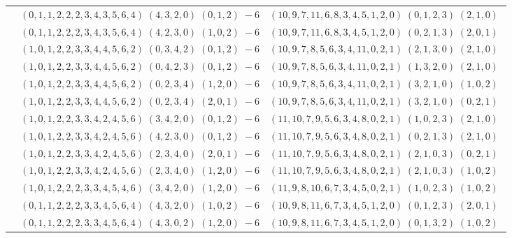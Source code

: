 \documentclass[11pt]{article}
\begin{document}
\begin{longtable}[l]{|c|c|c|}
 \cline{2-3} 
 & $(0 ,1 ,1 ,2 ,2 ,2 ,3 ,4 ,3 ,5 ,6 ,4) \;(4 ,3 ,2 ,0) \;(0 ,1 ,2) \;-6$ & $(10 ,9 ,7 ,11 ,6 ,8 ,3 ,4 ,5 ,1 ,2 ,0) \;(0 ,1 ,2 ,3) \;(2 ,1 ,0) \;$\\ 
 \cline{2-3} 
 & $(0 ,1 ,1 ,2 ,2 ,2 ,3 ,4 ,3 ,5 ,6 ,4) \;(4 ,2 ,3 ,0) \;(1 ,0 ,2) \;-6$ & $(10 ,9 ,7 ,11 ,6 ,8 ,3 ,4 ,5 ,1 ,2 ,0) \;(0 ,2 ,1 ,3) \;(2 ,0 ,1) \;$\\ 
 \cline{2-3} 
 & $(1 ,0 ,1 ,2 ,2 ,3 ,3 ,4 ,4 ,5 ,6 ,2) \;(0 ,3 ,4 ,2) \;(0 ,1 ,2) \;-6$ & $(10 ,9 ,7 ,8 ,5 ,6 ,3 ,4 ,11 ,0 ,2 ,1) \;(2 ,1 ,3 ,0) \;(2 ,1 ,0) \;$\\ 
 \cline{2-3} 
 & $(1 ,0 ,1 ,2 ,2 ,3 ,3 ,4 ,4 ,5 ,6 ,2) \;(0 ,4 ,2 ,3) \;(0 ,1 ,2) \;-6$ & $(10 ,9 ,7 ,8 ,5 ,6 ,3 ,4 ,11 ,0 ,2 ,1) \;(1 ,3 ,2 ,0) \;(2 ,1 ,0) \;$\\ 
 \cline{2-3} 
 & $(1 ,0 ,1 ,2 ,2 ,3 ,3 ,4 ,4 ,5 ,6 ,2) \;(0 ,2 ,3 ,4) \;(1 ,2 ,0) \;-6$ & $(10 ,9 ,7 ,8 ,5 ,6 ,3 ,4 ,11 ,0 ,2 ,1) \;(3 ,2 ,1 ,0) \;(1 ,0 ,2) \;$\\ 
 \cline{2-3} 
 & $(1 ,0 ,1 ,2 ,2 ,3 ,3 ,4 ,4 ,5 ,6 ,2) \;(0 ,2 ,3 ,4) \;(2 ,0 ,1) \;-6$ & $(10 ,9 ,7 ,8 ,5 ,6 ,3 ,4 ,11 ,0 ,2 ,1) \;(3 ,2 ,1 ,0) \;(0 ,2 ,1) \;$\\ 
 \cline{2-3} 
 & $(1 ,0 ,1 ,2 ,2 ,3 ,3 ,4 ,2 ,4 ,5 ,6) \;(3 ,4 ,2 ,0) \;(0 ,1 ,2) \;-6$ & $(11 ,10 ,7 ,9 ,5 ,6 ,3 ,4 ,8 ,0 ,2 ,1) \;(1 ,0 ,2 ,3) \;(2 ,1 ,0) \;$\\ 
 \cline{2-3} 
 & $(1 ,0 ,1 ,2 ,2 ,3 ,3 ,4 ,2 ,4 ,5 ,6) \;(4 ,2 ,3 ,0) \;(0 ,1 ,2) \;-6$ & $(11 ,10 ,7 ,9 ,5 ,6 ,3 ,4 ,8 ,0 ,2 ,1) \;(0 ,2 ,1 ,3) \;(2 ,1 ,0) \;$\\ 
 \cline{2-3} 
 & $(1 ,0 ,1 ,2 ,2 ,3 ,3 ,4 ,2 ,4 ,5 ,6) \;(2 ,3 ,4 ,0) \;(2 ,0 ,1) \;-6$ & $(11 ,10 ,7 ,9 ,5 ,6 ,3 ,4 ,8 ,0 ,2 ,1) \;(2 ,1 ,0 ,3) \;(0 ,2 ,1) \;$\\ 
 \cline{2-3} 
 & $(1 ,0 ,1 ,2 ,2 ,3 ,3 ,4 ,2 ,4 ,5 ,6) \;(2 ,3 ,4 ,0) \;(1 ,2 ,0) \;-6$ & $(11 ,10 ,7 ,9 ,5 ,6 ,3 ,4 ,8 ,0 ,2 ,1) \;(2 ,1 ,0 ,3) \;(1 ,0 ,2) \;$\\ 
 \cline{2-3} 
 & $(1 ,0 ,1 ,2 ,2 ,2 ,3 ,3 ,4 ,5 ,4 ,6) \;(3 ,4 ,2 ,0) \;(1 ,2 ,0) \;-6$ & $(11 ,9 ,8 ,10 ,6 ,7 ,3 ,4 ,5 ,0 ,2 ,1) \;(1 ,0 ,2 ,3) \;(1 ,0 ,2) \;$\\ 
 \cline{2-3} 
 & $(0 ,1 ,1 ,2 ,2 ,2 ,3 ,3 ,4 ,5 ,6 ,4) \;(4 ,3 ,2 ,0) \;(1 ,0 ,2) \;-6$ & $(10 ,9 ,8 ,11 ,6 ,7 ,3 ,4 ,5 ,1 ,2 ,0) \;(0 ,1 ,2 ,3) \;(2 ,0 ,1) \;$\\ 
 \cline{2-3} 
 & $(0 ,1 ,1 ,2 ,2 ,2 ,3 ,3 ,4 ,5 ,6 ,4) \;(4 ,3 ,0 ,2) \;(1 ,2 ,0) \;-6$ & $(10 ,9 ,8 ,11 ,6 ,7 ,3 ,4 ,5 ,1 ,2 ,0) \;(0 ,1 ,3 ,2) \;(1 ,0 ,2) \;$\\ 

\end{longtable}
\end{document}
